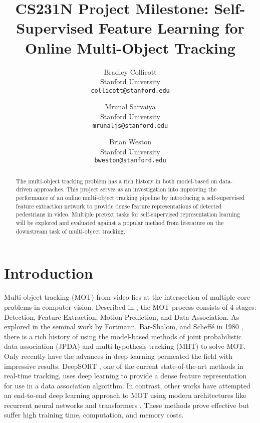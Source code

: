 \documentclass[10pt,twocolumn,letterpaper]{article}
\begin{document}
\title{CS231N Project Milestone: Self-Supervised Feature Learning for Online Multi-Object Tracking}

\author{Bradley Collicott\\
Stanford University\\
{\tt\small collicott@stanford.edu}
\and
Mrunal Sarvaiya\\
Stanford University\\
{\tt\small mrunaljs@stanford.edu}
\and
Brian Weston\\
Stanford University\\
{\tt\small bweston@stanford.edu}
}

\maketitle


\begin{abstract}
The multi-object tracking problem has a rich history in both model-based on data-driven approaches. This project serves as an investigation into improving the performance of an online multi-object tracking pipeline by introducing a self-supervised feature extraction network to provide dense feature representations of detected pedestrians in video. Multiple pretext tasks for self-supervised representation learning will be explored and evaluated against a popular method from literature on the downstream task of multi-object tracking.
\end{abstract}

\section{Introduction}
Multi-object tracking (MOT) from video lies at the intersection of multiple core problems in computer vision. Described in \cite{Ciaparrone2020}, the MOT process consists of 4 stages: Detection, Feature Extraction, Motion Prediction, and Data Association. As explored in the seminal work by Fortmann, Bar-Shalom, and Scheffé in 1980 \cite{Fortmann1980}, there is a rich history of using the model-based methods of joint probabilistic data association (JPDA) and multi-hypothesis tracking (MHT) to solve MOT. Only recently have the advances in deep learning permeated the field with impressive results. DeepSORT \cite{Wojke2018}, one of the current state-of-the-art methods in real-time tracking, uses deep learning to provide a dense feature representation for use in a data association algorithm. In contrast, other works have attempted an end-to-end deep learning approach to MOT using modern architectures like recurrent neural networks and transformers \cite{Bastani2021, Meinhardt2021}. These methods prove effective but suffer high training time, computation, and memory costs.
\end{document}
